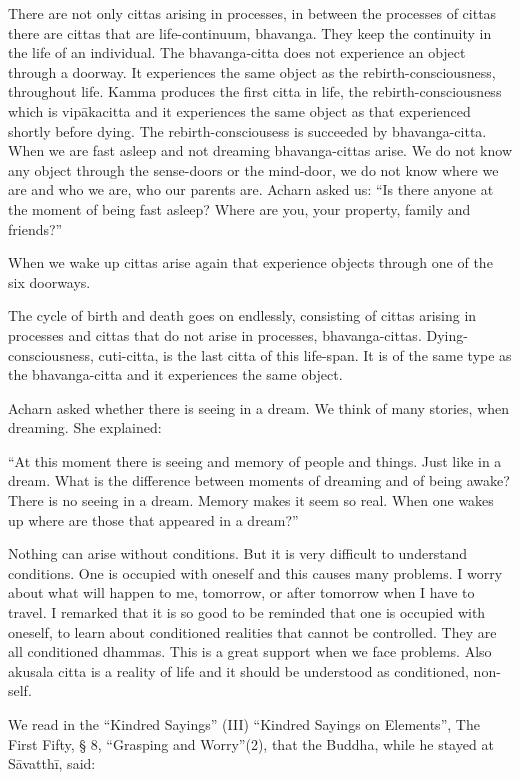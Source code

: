 There are not only cittas arising in processes, in between the processes
of cittas there are cittas that are life-continuum, bhavanga. They keep
the continuity in the life of an individual. The bhavanga-citta does not
experience an object through a doorway. It experiences the same object
as the rebirth-consciousness, throughout life. Kamma produces the first
citta in life, the rebirth-consciousness which is vipākacitta and it
experiences the same object as that experienced shortly before dying.
The rebirth-consciousess is succeeded by bhavanga-citta. When we are
fast asleep and not dreaming bhavanga-cittas arise. We do not know any
object through the sense-doors or the mind-door, we do not know where we
are and who we are, who our parents are. Acharn asked us: ``Is there
anyone at the moment of being fast asleep? Where are you, your property,
family and friends?''

When we wake up cittas arise again that experience objects through one
of the six doorways.

The cycle of birth and death goes on endlessly, consisting of cittas
arising in processes and cittas that do not arise in processes,
bhavanga-cittas. Dying-consciousness, cuti-citta, is the last citta of
this life-span. It is of the same type as the bhavanga-citta and it
experiences the same object.

Acharn asked whether there is seeing in a dream. We think of many
stories, when dreaming. She explained:

``At this moment there is seeing and memory of people and things. Just
like in a dream. What is the difference between moments of dreaming and
of being awake? There is no seeing in a dream. Memory makes it seem so
real. When one wakes up where are those that appeared in a dream?''

Nothing can arise without conditions. But it is very difficult to
understand conditions. One is occupied with oneself and this causes many
problems. I worry about what will happen to me, tomorrow, or after
tomorrow when I have to travel. I remarked that it is so good to be
reminded that one is occupied with oneself, to learn about conditioned
realities that cannot be controlled. They are all conditioned dhammas.
This is a great support when we face problems. Also akusala citta is a
reality of life and it should be understood as conditioned, non-self.

We read in the ``Kindred Sayings'' (III) ``Kindred Sayings on
Elements'', The First Fifty, § 8, ``Grasping and Worry''(2), that the
Buddha, while he stayed at Sāvatthī, said:

